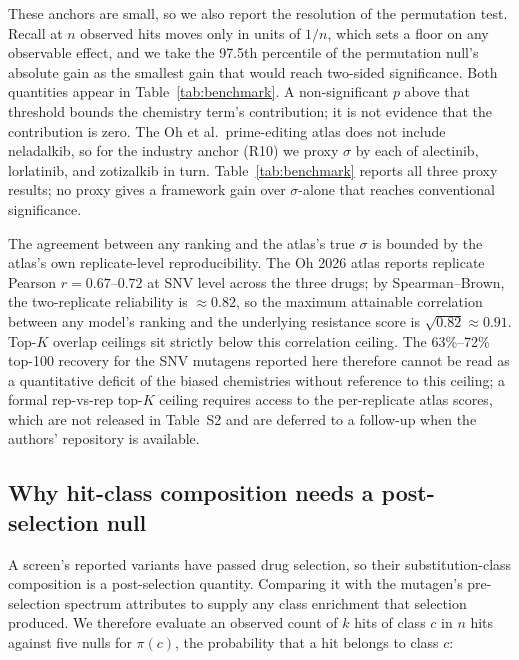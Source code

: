 \documentclass[11pt,a4paper]{article}
\begin{document}
These anchors are small, so we also report the resolution of the
permutation test. Recall at $n$ observed hits moves only in units of $1/n$,
which sets a floor on any observable effect, and we take the 97.5th
percentile of the permutation null's absolute gain as the smallest
gain that would reach two-sided significance. Both quantities appear
in Table~\ref{tab:benchmark}. A non-significant $p$ above that
threshold bounds the chemistry term's contribution; it is not evidence
that the contribution is zero.
The Oh et al.\ prime-editing atlas does not include neladalkib, so
for the industry anchor (R10) we proxy $\sigma$ by each of alectinib,
lorlatinib, and zotizalkib in turn. Table~\ref{tab:benchmark} reports
all three proxy results; no proxy gives a framework gain over
$\sigma$-alone that reaches conventional significance.

The agreement between any ranking and the atlas's true $\sigma$ is
bounded by the atlas's own replicate-level reproducibility. The Oh
2026 \citep{oh2026} atlas reports replicate Pearson $r = 0.67$--$0.72$
at SNV level across the three drugs; by Spearman--Brown, the
two-replicate reliability is $\approx 0.82$, so the maximum attainable
correlation between any model's ranking and the underlying resistance
score is $\sqrt{0.82} \approx 0.91$. Top-$K$ overlap ceilings sit
strictly below this correlation ceiling. The 63\%--72\% top-100
recovery for the SNV mutagens reported here therefore cannot be read
as a quantitative deficit of the biased chemistries without reference
to this ceiling; a formal rep-vs-rep top-$K$ ceiling requires access
to the per-replicate atlas scores, which are not released in Table~S2
and are deferred to a follow-up when the authors' repository is
available.

\subsection{Why hit-class composition needs a post-selection null}
\label{sec:class-test}
A screen's reported variants have passed drug selection, so their
substitution-class composition is a post-selection quantity. Comparing
it with the mutagen's pre-selection spectrum attributes to supply any
class enrichment that selection produced. We therefore evaluate an
observed count of $k$ hits of class $c$ in $n$ hits against five
nulls for $\pi(c)$, the probability that a hit belongs to class $c$:
\end{document}

